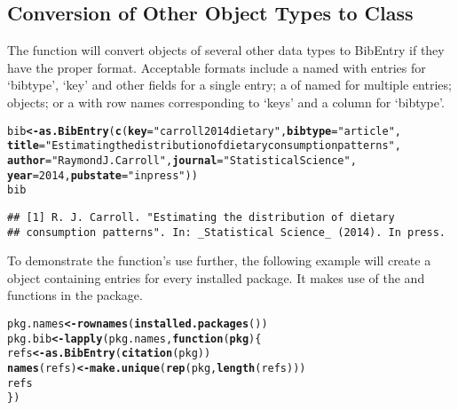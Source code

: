 \documentclass[article]{jss}\usepackage[]{graphicx}\usepackage[]{color}
\makeatletter
\newcommand{\hlnum}[1]{\textcolor[rgb]{0.125,0.125,1}{#1}}%
\newcommand{\hlstr}[1]{\textcolor[rgb]{0.125,0.125,1}{#1}}%
\newcommand{\hlstd}[1]{\textcolor[rgb]{0.251,0.251,0.282}{#1}}%
\newcommand{\hlkwa}[1]{\textcolor[rgb]{0,0.533,0.345}{\textbf{#1}}}%
\newcommand{\hlkwb}[1]{\textcolor[rgb]{0.439,0.251,1}{\textbf{#1}}}%
\newcommand{\hlkwc}[1]{\textcolor[rgb]{0.529,0,0.184}{\textbf{#1}}}%
\newcommand{\hlkwd}[1]{\textcolor[rgb]{0.251,0.251,0.282}{\textbf{#1}}}%
\newenvironment{kframe}{%
 \def\at@end@of@kframe{}%
 \ifinner\ifhmode%
  \def\at@end@of@kframe{\end{minipage}}%
  \begin{minipage}{\columnwidth}%
 \fi\fi%
 \def\FrameCommand##1{\hskip\@totalleftmargin \hskip-\fboxsep
 \colorbox{shadecolor}{##1}\hskip-\fboxsep
     \hskip-\linewidth \hskip-\@totalleftmargin \hskip\columnwidth}%
 \MakeFramed {\advance\hsize-\width
   \@totalleftmargin\z@ \linewidth\hsize
   \@setminipage}}%
 {\par\unskip\endMakeFramed%
 \at@end@of@kframe}
\newenvironment{knitrout}{}{} %
\makeatother
\begin{document}
\subsection[Conversion of Other Object Types to Class BibEntry]{Conversion of Other Object Types to Class }
The  function will convert objects of several other data types to BibEntry if they have the proper format.  Acceptable formats include a named  with entries for `bibtype', `key' and other fields for a single entry; a  of named  for multiple entries;  objects; or a  with row names corresponding to `keys' and a column for `bibtype'.
\begin{knitrout}
\color{fgcolor}\begin{kframe}
\begin{alltt}
\hlstd{bib} \hlkwb{<-} \hlkwd{as.BibEntry}\hlstd{(}\hlkwd{c}\hlstd{(}\hlkwc{key} \hlstd{=} \hlstr{"carroll2014dietary"}\hlstd{,} \hlkwc{bibtype} \hlstd{=} \hlstr{"article"}\hlstd{,}
  \hlkwc{title} \hlstd{=} \hlstr{"Estimating the distribution of dietary consumption patterns"}\hlstd{,}
  \hlkwc{author} \hlstd{=} \hlstr{"Raymond J. Carroll"}\hlstd{,} \hlkwc{journal} \hlstd{=} \hlstr{"Statistical Science"}\hlstd{,}
  \hlkwc{year} \hlstd{=} \hlnum{2014}\hlstd{,} \hlkwc{pubstate} \hlstd{=} \hlstr{"inpress"}\hlstd{))}
\hlstd{bib}
\end{alltt}
\begin{verbatim}
## [1] R. J. Carroll. "Estimating the distribution of dietary
## consumption patterns". In: _Statistical Science_ (2014). In press.
\end{verbatim}
\end{kframe}
\end{knitrout}


To demonstrate the function's use further, the following example will create a  object containing entries for every installed \R{} package.  It makes use of the  and  functions in the  package.
\begin{knitrout}
\color{fgcolor}\begin{kframe}
\begin{alltt}
\hlstd{pkg.names} \hlkwb{<-} \hlkwd{rownames}\hlstd{(}\hlkwd{installed.packages}\hlstd{())}
\hlstd{pkg.bib} \hlkwb{<-} \hlkwd{lapply}\hlstd{(pkg.names,} \hlkwa{function}\hlstd{(}\hlkwc{pkg}\hlstd{)\{}
  \hlstd{refs} \hlkwb{<-} \hlkwd{as.BibEntry}\hlstd{(}\hlkwd{citation}\hlstd{(pkg))}
  \hlkwd{names}\hlstd{(refs)} \hlkwb{<-} \hlkwd{make.unique}\hlstd{(}\hlkwd{rep}\hlstd{(pkg,} \hlkwd{length}\hlstd{(refs)))}
  \hlstd{refs}
\hlstd{\})}
\end{alltt}
\end{kframe}
\end{knitrout}
\end{document}
